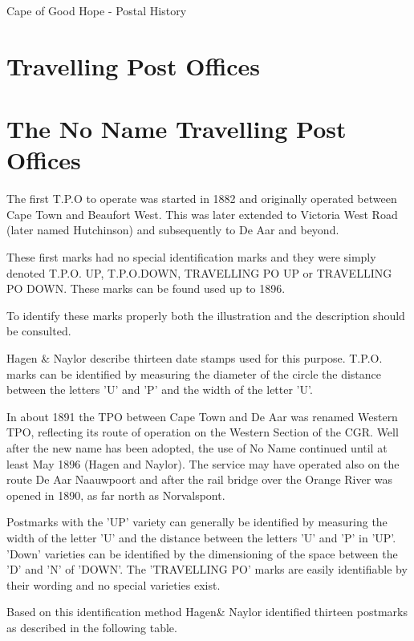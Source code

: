 Cape of Good Hope - Postal History

\section{Travelling Post Offices}
\section{The No Name Travelling Post Offices}




	 


The first T.P.O to operate was started in 1882 and originally operated 
between Cape Town and Beaufort West. 
This was later extended to Victoria West Road (later named Hutchinson) 
and subsequently to De Aar and beyond. 

These first marks had no special identification marks and they were simply 
denoted T.P.O. UP, T.P.O.DOWN, 
TRAVELLING PO UP or TRAVELLING PO DOWN. These marks can be found used up to 1896.

To identify these marks properly both the illustration and the 
description should be consulted.

Hagen \& Naylor describe thirteen date stamps used for this purpose.
T.P.O. marks can be identified by measuring the diameter of the 
circle the distance between the letters 'U' and 'P' and the width of the letter 'U'.

In about 1891 the TPO between Cape Town and De Aar was renamed
Western TPO, reflecting its route of operation 
on the Western Section of the CGR. 
Well after the new name has been adopted, the use of No Name continued 
until at least May 1896 (Hagen and Naylor). 
The service may have operated also on the route De Aar Naauwpoort and 
after the rail bridge over the Orange River was opened in 1890, as far 
north as Norvalspont.

Postmarks with the 'UP' variety can generally be identified by 
measuring the width of the letter 'U' and the distance between 
the letters 'U' and 'P' in 'UP'. 'Down' varieties can be identified 
by the dimensioning of the space between the 'D' and 'N' of 'DOWN'. 
The 'TRAVELLING PO' marks are easily identifiable by their wording 
and no special varieties exist.

Based on this identification method Hagen\& Naylor identified 
thirteen postmarks as described in the following table.

         